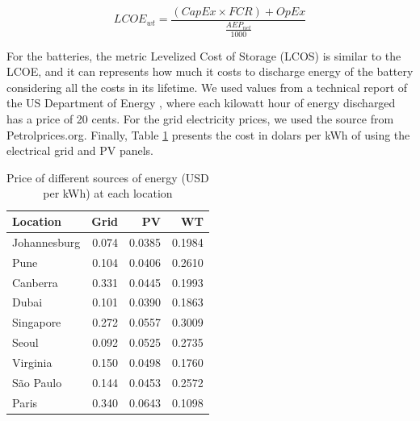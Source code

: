 
\begin{equation} \label{eq:wt_lcoe}
  LCOE_{wt} = \frac{ (CapEx \times FCR) + OpEx}{ \frac{AEP_{net}}{1000}   }
\end{equation}

For the batteries, the metric Levelized Cost of Storage (LCOS) is similar to the LCOE, and it can represents how much it costs to discharge energy of the battery considering all the costs in its lifetime. We used values from a technical report of the US Department of Energy \cite{battery_lcos_2022}, where each kilowatt hour of energy discharged has a price of 20 cents. For the grid electricity prices, we used the source from Petrolprices.org. Finally, Table \ref{tab:price_electricity_sources} presents the cost in dolars per kWh of using the electrical grid and PV panels.

\begin{table}[H]
  
  \caption{Price of different sources of energy (USD per kWh) at each location }\label{tab:price_electricity_sources} \centering
  
  \begin{tabular}{|l|r|r|r|}
  \hline    
  \textbf{Location} &   \textbf{Grid} & \textbf{PV} & \textbf{WT} \\
  \hline
  Johannesburg & 0.074 & 0.0385 &  0.1984   \\
  \hline
  Pune      &  0.104   & 0.0406 & 0.2610    \\
  \hline
  Canberra  & 0.331    &  0.0445 & 0.1993   \\
  \hline
  Dubai   & 0.101      & 0.0390 &   0.1863  \\
  \hline
  Singapore & 0.272    & 0.0557 & 0.3009    \\
  \hline     
  Seoul      & 0.092   & 0.0525 & 0.2735    \\
  \hline
  Virginia   & 0.150   &  0.0498 &  0.1760  \\
  \hline
  São Paulo  & 0.144   &  0.0453 & 0.2572   \\
  \hline 
  Paris      & 0.340   &  0.0643 & 0.1098   \\
  \hline  

\end{tabular}
\end{table}

